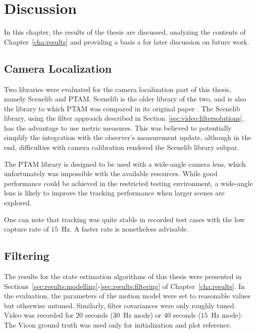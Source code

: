 \chapter{Discussion}
\label{cha:discussion}
    In this chapter, the results of the thesis are discussed,
    analyzing the contents of Chapter~\ref{cha:results} and providing
    a basis a for later discussion on future work.

    \section{Camera Localization}
    \label{sec:discussion:cameralocalization}
        Two libraries were evaluated for the camera localization part of this thesis,
        namely Scenelib and PTAM. Scenelib is the older library of the two,
        and is also the library to which PTAM was compared in its original paper \citep{klein07parallel}.
        The Scenelib library, using the filter approach described in Section~\ref{sec:video:filtersolutions},
        has the advantage to use metric measures.
        This was believed to potentially simplify the integration with the
        observer's measurement update, although in the end, difficulties
        with camera calibration rendered the Scenelib library subpar.

        The PTAM library is designed to be used with a wide-angle camera lens,
        which unfortunately was impossible with the available resources.
        While good performance could be achieved in the restricted testing
        environment, a wide-angle lens is likely to improve the tracking
        performance when larger scenes are explored.

        One can note that tracking was quite stable in recorded test cases
        with the low capture rate of $15$~Hz. A faster rate is nonetheless advisable.

    \section{Filtering}
        The results for the state estimation algorithms of this thesis
        were presented in Sections~\ref{sec:results:modelling}-\ref{sec:results:filtering} of Chapter~\ref{cha:results}.
        In the evaluation, the parameters of the motion model were set to reasonable values
        but otherwise untuned. Similarly, filter covariances were only roughly
        tuned. Video was recorded for $20$ seconds ($30$~Hz mode)
        or $40$ seconds ($15$~Hz mode). The Vicon ground truth was used only for
        initialization and plot reference.

